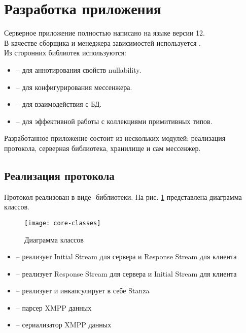\section{Разработка приложения}

\noindent Серверное приложение полностью написано на языке  версии 12.\\
В качестве сборщика и менеджера зависимостей используется .\\
Из сторонних библиотек используются:
\begin{itemize}
	\item {} -- для аннотирования свойств nullability.
	\item {} -- для конфигурирования мессенжера.
	\item {} -- для взаимодействия с БД.
	\item {} -- для эффективной работы с коллекциями примитивных типов.
\end{itemize}

Разработанное приложение состоит из нескольких модулей: реализация протокола, серверная библиотека, хранилище и сам мессенжер.

\subsection{Реализация протокола}

Протокол реализован в виде -библиотеки. На рис. \ref{fig:core-classes} представлена диаграмма классов.

\begin{figure}[H]
	\centering
	\texttt{[image: core-classes]}
	\caption{Диаграмма классов}
	\label{fig:core-classes}
\end{figure}

\begin{itemize}
	\item {} -- реализует Initial Stream для сервера и Response Stream для клиента
	\item {} -- реализует Response Stream для сервера и Initial Stream для клиента
	\item {} -- реализует и инкапсулирует в себе Stanza
	\item {} -- парсер XMPP данных
	\item {} -- сериализатор XMPP данных
\end{itemize}

